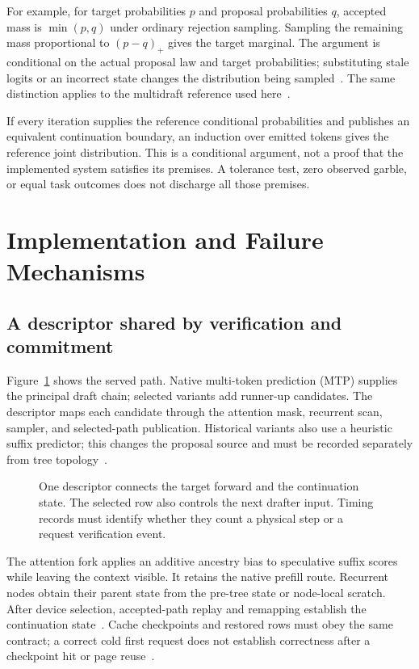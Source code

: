 \documentclass[conference]{IEEEtran}
\begin{document}
For example, for target probabilities $p$ and proposal probabilities $q$, accepted mass is $\min(p,q)$ under ordinary rejection sampling. Sampling the remaining mass proportional to $(p-q)_+$ gives the target marginal. The argument is conditional on the actual proposal law and target probabilities; substituting stale logits or an incorrect state changes the distribution being sampled~\cite{leviathan2023fast,chen2023sampling}. The same distinction applies to the multidraft reference used here~\cite{miao2023specinfer,lumo2026receipts}.

If every iteration supplies the reference conditional probabilities and publishes an equivalent continuation boundary, an induction over emitted tokens gives the reference joint distribution. This is a conditional argument, not a proof that the implemented system satisfies its premises. A tolerance test, zero observed garble, or equal task outcomes does not discharge all those premises.

\section{Implementation and Failure Mechanisms}
\subsection{A descriptor shared by verification and commitment}
Figure~\ref{fig:pipeline} shows the served path. Native multi-token prediction (MTP) supplies the principal draft chain; selected variants add runner-up candidates. The descriptor maps each candidate through the attention mask, recurrent scan, sampler, and selected-path publication. Historical variants also use a heuristic suffix predictor; this changes the proposal source and must be recorded separately from tree topology~\cite{lumo2026receipts,lumo2026cost}.

\begin{figure}[t]
\centering

\caption{One descriptor connects the target forward and the continuation state. The selected row also controls the next drafter input. Timing records must identify whether they count a physical step or a request verification event.}
\label{fig:pipeline}
\end{figure}

The attention fork applies an additive ancestry bias to speculative suffix scores while leaving the context visible. It retains the native prefill route. Recurrent nodes obtain their parent state from the pre-tree state or node-local scratch. After device selection, accepted-path replay and remapping establish the continuation state~\cite{lumo2026receipts}. Cache checkpoints and restored rows must obey the same contract; a correct cold first request does not establish correctness after a checkpoint hit or page reuse~\cite{lumo2026stateless}.
\end{document}
